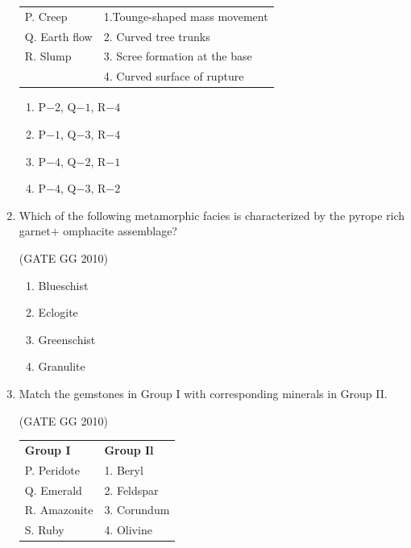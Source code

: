 \documentclass[journal]{IEEEtran}
\begin{document}
\begin{enumerate}
\begin{tabular}{ l l }
P. Creep & 1.Tounge-shaped mass movement\\
Q. Earth flow & 2. Curved tree trunks\\
R. Slump & 3. Scree formation at the base\\
& 4. Curved surface of rupture
\end{tabular}
\begin{multicols}{2}
\begin{enumerate}

    \item P$- 2$, Q$- 1$, R$- 4$
    \item P$- 1$, Q$- 3$, R$- 4$
    \item P$- 4$, Q$- 2$, R$- 1$
    \item P$- 4$, Q$- 3$, R$- 2$
\end{enumerate}
\end{multicols}

\item Which of the following metamorphic facies is characterized by the pyrope rich garnet$+$ omphacite assemblage?

\hfill (GATE GG 2010) 
\begin{multicols}{2}

\begin{enumerate}

     \item Blueschist
     \item Eclogite
     \item Greenschist
     \item Granulite

\end{enumerate}
\end{multicols}
\item Match the gemstones in Group I with corresponding minerals in Group II.

\hfill (GATE GG 2010) \\
\begin{tabular}{ l l }
\textbf{Group I} & \textbf{Group Il}\\
P. Peridote & 1. Beryl\\
Q. Emerald & 2. Feldspar\\
R. Amazonite & 3. Corundum\\
S. Ruby & 4. Olivine\\
\end{tabular}
\begin{multicols}{2}
\begin{enumerate}


\end{enumerate}
\end{multicols}
\end{enumerate}
\end{document}
